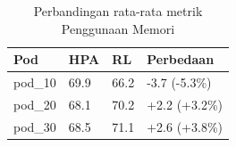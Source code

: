 \begin{table}[ht]
  \centering
  \caption{Perbandingan rata-rata metrik Penggunaan Memori}\label{tab:deskriptif-memory}
  \begin{tabular}{llll}
    \toprule
    Pod & HPA & RL & Perbedaan \\
    \midrule
    pod\_10 & 69.9 & 66.2 & -3.7 (-5.3\%) \\
    pod\_20 & 68.1 & 70.2 & +2.2 (+3.2\%) \\
    pod\_30 & 68.5 & 71.1 & +2.6 (+3.8\%) \\
    \bottomrule
  \end{tabular}
\end{table}
